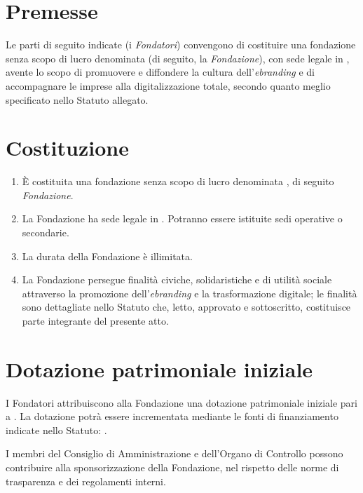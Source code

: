 \maketitle

\section*{Premesse}
Le parti di seguito indicate (i \emph{Fondatori}) convengono di costituire una fondazione senza scopo di lucro denominata  (di seguito, la \emph{Fondazione}), con sede legale in \FondazioneSedeLegale, avente lo scopo di promuovere e diffondere la cultura dell'\emph{ebranding} e di accompagnare le imprese alla digitalizzazione totale, secondo quanto meglio specificato nello Statuto allegato.

\section*{Costituzione}
\begin{enumerate}[label=\arabic*)]
  \item È costituita una fondazione senza scopo di lucro denominata , di seguito \emph{Fondazione}.
  \item La Fondazione ha sede legale in . Potranno essere istituite sedi operative o secondarie.
  \item La durata della Fondazione è illimitata.
  \item La Fondazione persegue finalità civiche, solidaristiche e di utilità sociale attraverso la promozione dell'\emph{ebranding} e la trasformazione digitale; le finalità sono dettagliate nello Statuto che, letto, approvato e sottoscritto, costituisce parte integrante del presente atto.
\end{enumerate}

\section*{Dotazione patrimoniale iniziale}
I Fondatori attribuiscono alla Fondazione una dotazione patrimoniale iniziale pari a . La dotazione potrà essere incrementata mediante le fonti di finanziamento indicate nello Statuto: \FontiFinanziamento.

I membri del Consiglio di Amministrazione e dell'Organo di Controllo possono contribuire alla sponsorizzazione della Fondazione, nel rispetto delle norme di trasparenza e dei regolamenti interni.

